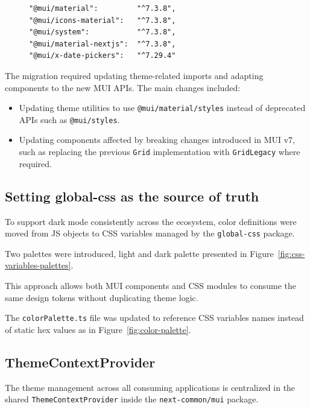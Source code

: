 \begin{figure}[h]
    \centering
    \begin{minipage}{0.5\textwidth}
        \begin{lstlisting}[caption={MUI dependencies update}]
"@mui/material":         "^7.3.8",
"@mui/icons-material":   "^7.3.8",
"@mui/system":           "^7.3.8",
"@mui/material-nextjs":  "^7.3.8",
"@mui/x-date-pickers":   "^7.29.4"
        \end{lstlisting}
    \end{minipage}
\end{figure}

The migration required updating theme-related imports and adapting components to the new MUI APIs. The main changes included:

\begin{itemize}
    \item Updating theme utilities to use \lstinline|@mui/material/styles| instead of deprecated APIs such as \lstinline|@mui/styles|.
    \item Updating components affected by breaking changes introduced in MUI v7, such as replacing the previous \lstinline|Grid| implementation with \lstinline|GridLegacy| where required.
\end{itemize}

\subsection{Setting \textbf{global-css} as the source of truth}

To support dark mode consistently across the ecosystem, color definitions were moved from \ac{JS} objects to CSS variables managed by the \texttt{global-css} package.

Two palettes were introduced, light and dark palette presented in Figure~\ref{fig:css-variables-palettes}.

This approach allows both MUI components and CSS modules to consume the same design tokens without duplicating theme logic.

The \lstinline|colorPalette.ts| file was updated to reference CSS variables names instead of static hex values as in Figure~\ref{fig:color-palette}.

\subsection{{ThemeContextProvider}}

The theme management across all consuming applications is centralized in the shared \texttt{ThemeContextProvider} inside the \texttt{next-common/mui} package.

